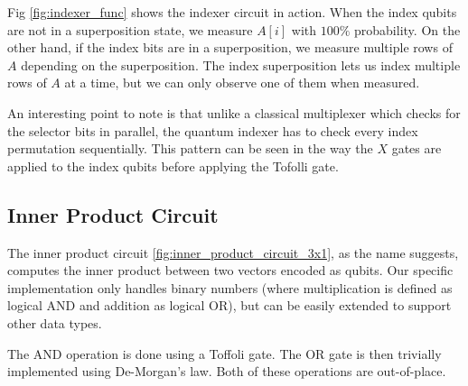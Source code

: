 \documentclass[11pt]{article}
\theoremstyle{definition}
\theoremstyle{remark}
\begin{document}
Fig \ref{fig:indexer_func} shows the indexer circuit in action. When the index
qubits are not in a superposition state, we measure $A[i]$ with $100\%$
probability. On the other hand, if the index bits are in a superposition, we
measure multiple rows of $A$ depending on the superposition. The index
superposition lets us index multiple rows of $A$ at a time, but we can only
observe one of them when measured.

An interesting point to note is that unlike a classical multiplexer which
checks for the selector bits in parallel, the quantum indexer has to check
every index permutation sequentially. This pattern can be seen in the way
the $X$ gates are applied to the index qubits before applying the Tofolli
gate.

\subsection{Inner Product Circuit}

The inner product circuit \ref{fig:inner_product_circuit_3x1}, as the name
suggests, computes the inner product between two vectors encoded as qubits. Our
specific implementation only handles binary numbers (where multiplication is
defined as logical AND and addition as logical OR), but can be easily
extended to support other data types.

The AND operation is done using a Toffoli gate.  The OR gate is then
trivially implemented using De-Morgan's law. Both of these operations are
out-of-place.

\end{document}

